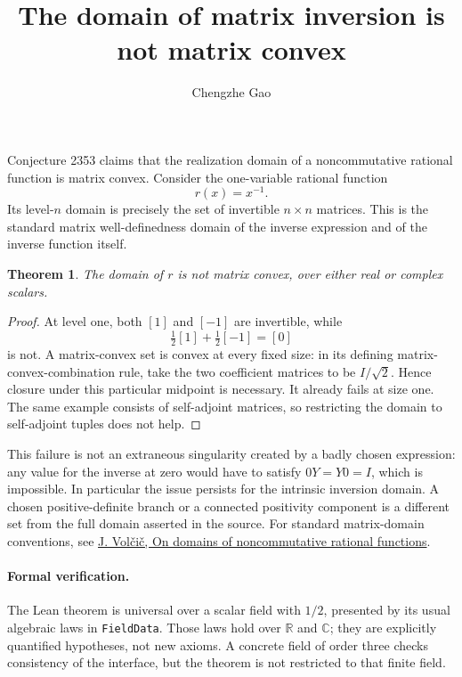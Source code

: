 \documentclass[11pt]{article}
\newtheorem{theorem}{Theorem}
\begin{document}
\title{The domain of matrix inversion is not matrix convex}
\author{Chengzhe Gao}\date{}\maketitle
Conjecture 2353 claims that the realization domain of a noncommutative
rational function is matrix convex. Consider the one-variable rational
function
\[
 r(x)=x^{-1}.
\]
Its level-$n$ domain is precisely the set of invertible $n\times n$ matrices.
This is the standard matrix well-definedness domain of the inverse
expression and of the inverse function itself.

\begin{theorem}
The domain of $r$ is not matrix convex, over either real or complex scalars.
\end{theorem}
\begin{proof}
At level one, both $[1]$ and $[-1]$ are invertible, while
\[
 \tfrac12[1]+\tfrac12[-1]=[0]
\]
is not. A matrix-convex set is convex at every fixed size: in its defining
matrix-convex-combination rule, take the two coefficient matrices to be
$I/\sqrt2$. Hence closure under this particular midpoint is necessary.
It already fails at size one. The same example consists of self-adjoint
matrices, so restricting the domain to self-adjoint tuples does not help.
\end{proof}

This failure is not an extraneous singularity created by a badly chosen
expression: any value for the inverse at zero would have to satisfy
$0Y=Y0=I$, which is impossible. In particular the issue persists for the
intrinsic inversion domain. A chosen positive-definite branch or a
connected positivity component is a different set from the full domain
asserted in the source. For standard matrix-domain conventions, see
\href{https://arxiv.org/abs/1608.02594}{J. Vol\v{c}i\v{c}, On domains of
noncommutative rational functions}.

\paragraph{Formal verification.}
The Lean theorem is universal over a scalar field with $1/2$, presented
by its usual algebraic laws in \texttt{FieldData}. Those laws hold over
$\mathbb R$ and $\mathbb C$; they are explicitly quantified hypotheses,
not new axioms. A concrete field of order three checks consistency of the
interface, but the theorem is not restricted to that finite field.
\end{document}
